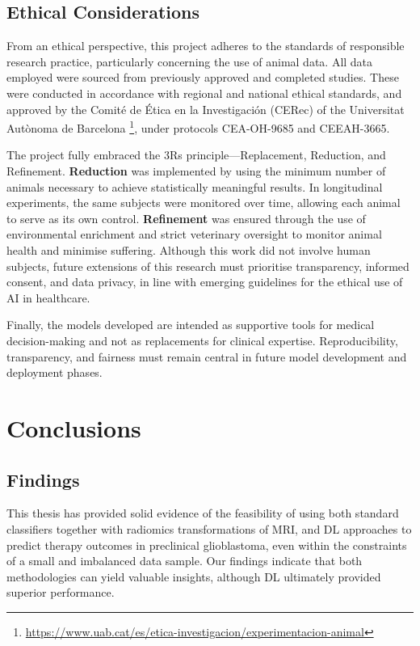 \documentclass[12pt, a4paper]{report}
\begin{document}
\section{Ethical Considerations}

From an ethical perspective, this project adheres to the standards of responsible research practice, particularly concerning the use of animal data. All data employed were sourced from previously approved and completed studies. These were conducted in accordance with regional and national ethical standards, and approved by the Comité de Ética en la Investigación (CERec) of the Universitat Autònoma de Barcelona \footnote{\url{https://www.uab.cat/es/etica-investigacion/experimentacion-animal}}, under protocols CEA-OH-9685 and CEEAH-3665.

The project fully embraced the 3Rs principle—Replacement, Reduction, and Refinement. \textbf{Reduction} was implemented by using the minimum number of animals necessary to achieve statistically meaningful results. In longitudinal experiments, the same subjects were monitored over time, allowing each animal to serve as its own control. \textbf{Refinement} was ensured through the use of environmental enrichment and strict veterinary oversight to monitor animal health and minimise suffering. Although this work did not involve human subjects, future extensions of this research must prioritise transparency, informed consent, and data privacy, in line with emerging guidelines for the ethical use of AI in healthcare.

Finally, the models developed are intended as supportive tools for medical decision-making and not as replacements for clinical expertise. Reproducibility, transparency, and fairness must remain central in future model development and deployment phases.

\chapter{Conclusions}

\section{Findings}

This thesis has provided solid evidence of the feasibility of using both standard classifiers together with radiomics transformations of MRI, and DL approaches to predict therapy outcomes in preclinical glioblastoma, even within the constraints of a small and imbalanced data sample. Our findings indicate that both methodologies can yield valuable insights, although DL ultimately provided superior performance.
\end{document}
